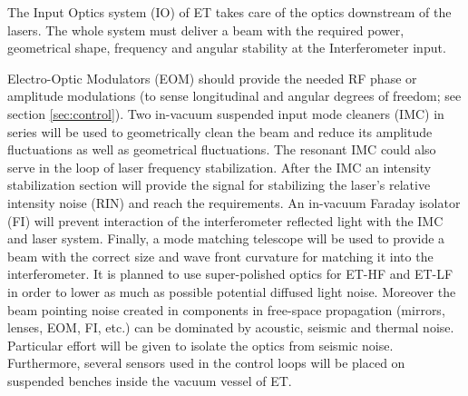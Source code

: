 The Input Optics system (IO) of ET takes care of the optics downstream of the lasers. The whole system must deliver a beam with the required power, geometrical shape, frequency and angular stability at the Interferometer input.




%

Electro-Optic Modulators (EOM) should provide the needed RF phase or amplitude modulations
(to sense longitudinal and angular degrees of freedom; see section \ref{sec:control}). Two in-vacuum suspended input mode cleaners (IMC)
in series will be used to geometrically clean the beam and reduce its amplitude fluctuations as well as geometrical fluctuations. The
resonant IMC could also serve in the loop of laser frequency stabilization. After the IMC an intensity stabilization
section will provide the signal for stabilizing the laser's relative intensity noise (RIN)
and reach the requirements. An in-vacuum Faraday
isolator (FI) will prevent interaction of the interferometer reflected light with the IMC and laser system. Finally, a mode matching telescope will be used to
provide a beam with the correct size and wave front curvature  for matching it into the interferometer.
It is planned to use super-polished optics for ET-HF and ET-LF in order to lower as much as possible potential diffused
light noise.
Moreover the beam pointing noise created in components in free-space propagation (mirrors, lenses, EOM, FI,
etc.) can be dominated by acoustic, seismic and thermal noise. Particular effort will be given to isolate
the optics from seismic noise. Furthermore, several sensors used in the control loops will be placed on
suspended benches inside the vacuum vessel of ET.

